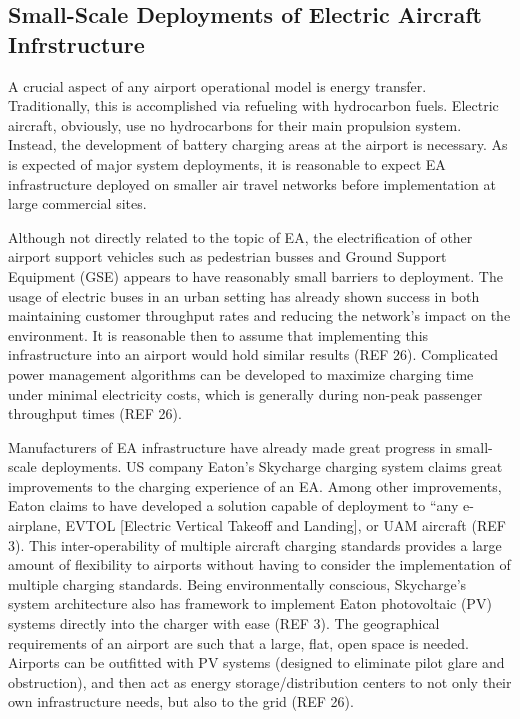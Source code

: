 \documentclass[../main.tex]{subfiles}
\begin{document}
\subsection{Small-Scale Deployments of Electric Aircraft Infrstructure}
A crucial aspect of any airport operational model is energy transfer. Traditionally, this is accomplished via refueling with hydrocarbon fuels. Electric aircraft, obviously, use no hydrocarbons for their main propulsion system. Instead, the development of battery charging areas at the airport is necessary. As is expected of major system deployments, it is reasonable to expect EA infrastructure deployed on smaller air travel networks before implementation at large commercial sites.\par
Although not directly related to the topic of EA, the electrification of other airport support vehicles such as pedestrian busses and Ground Support Equipment (GSE) appears to have reasonably small barriers to deployment. The usage of electric buses in an urban setting has already shown success in both maintaining customer throughput rates and reducing the network’s impact on the environment.  It is reasonable then to assume that implementing this infrastructure into an airport would hold similar results (REF 26). Complicated power management algorithms can be developed to maximize charging time under minimal electricity costs, which is generally during non-peak passenger throughput times (REF 26).\par
Manufacturers of EA infrastructure have already made great progress in small-scale deployments. US company Eaton’s Skycharge charging system claims great improvements to the charging experience of an EA. Among other improvements,  Eaton claims to have developed a solution capable of deployment to “any e-airplane, EVTOL [Electric Vertical Takeoff and Landing], or UAM aircraft (REF 3). This inter-operability of multiple aircraft charging standards provides a large amount of flexibility to airports without having to consider the implementation of multiple charging standards. Being environmentally conscious, Skycharge’s system architecture also has framework to implement Eaton photovoltaic (PV) systems directly into the charger with ease (REF 3). The geographical requirements of an airport are such that a large, flat, open space is needed. Airports can be outfitted with PV systems (designed to eliminate pilot glare and obstruction), and then act as energy storage/distribution centers to not only their own infrastructure needs, but also to the grid (REF 26).\par
\end{document}
